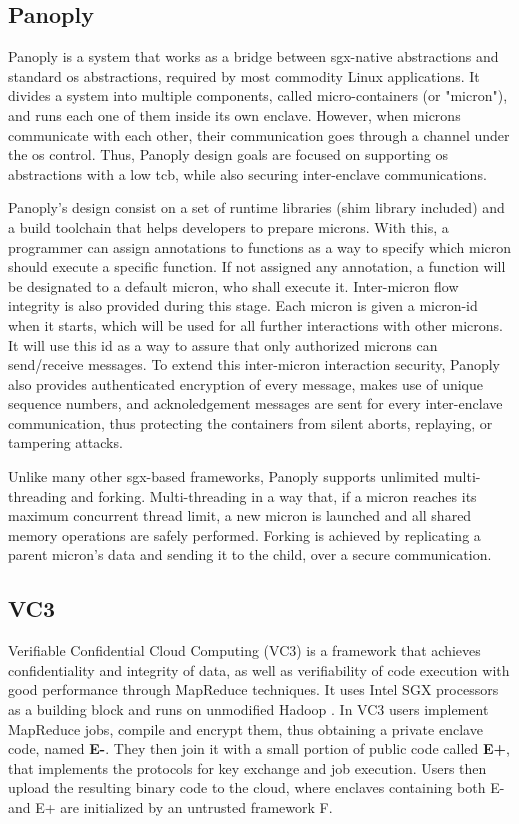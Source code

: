\subsection{Panoply}
\label{ssec:panoply}

Panoply \cite{panoplyPaper} is a system that works as a bridge between \gls{sgx}-native abstractions and standard \gls{os} abstractions, required by most commodity Linux applications. 
It divides a system into multiple components, called micro-containers (or "micron"), and runs each one of them inside its own enclave. 
However, when microns communicate with each other, their communication goes through a channel under the \gls{os} control. Thus, Panoply design goals are focused on supporting \gls{os} abstractions with a low \gls{tcb}, while also securing inter-enclave communications.

Panoply's design consist on a set of runtime libraries (shim library included) and a build toolchain that helps developers to prepare microns.
With this, a programmer can assign annotations to functions as a way to specify which micron should execute a specific function. If not assigned any annotation, a function will be designated to a default micron, who shall execute it. Inter-micron flow integrity is also provided during this stage. 
Each micron is given a micron-id when it starts, which will be used for all further interactions with other microns. It will use this id as a way to assure that only authorized microns can send/receive messages.
To extend this inter-micron interaction security, Panoply also provides authenticated encryption of every message, makes use of unique sequence numbers, and acknoledgement messages are sent for every inter-enclave communication, thus protecting the containers from silent aborts, replaying, or tampering attacks.

Unlike many other \gls{sgx}-based frameworks, Panoply supports unlimited multi-threading and forking. Multi-threading in a way that, if a micron reaches its maximum concurrent thread limit, a new micron is launched and all shared memory operations are safely performed. Forking is achieved by replicating a parent micron's data and sending it to the child, over a secure communication. 


\subsection{VC3}
\label{ssec:vc3_mapreduce}

Verifiable Confidential Cloud Computing (VC3) \cite{vc3Paper} is a framework that achieves confidentiality and integrity of data, as well as verifiability of code execution with good performance through MapReduce \cite{mapReduce} techniques. It uses Intel SGX processors as a building block and runs on unmodified Hadoop \cite{hadoop}.
In VC3 users implement MapReduce jobs, compile and encrypt them, thus obtaining a private enclave code, named \textbf{E-}. They then join it with a small portion of public code called \textbf{E+}, that implements the protocols for key exchange and job execution.
Users then upload the resulting binary code to the cloud, where enclaves containing both E- and E+ are initialized by an untrusted framework F. 


